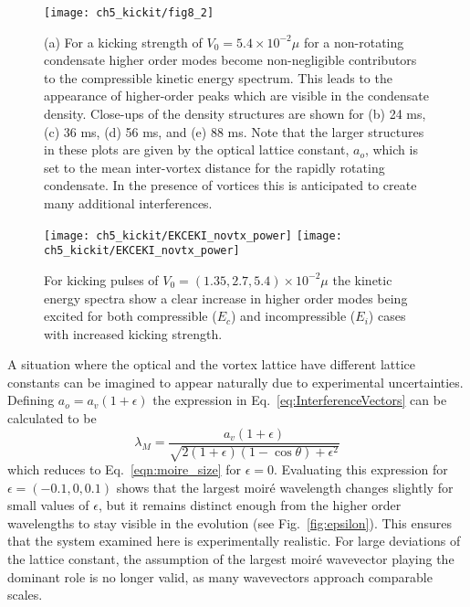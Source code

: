 \begin{figure}
    \centering
	\texttt{[image: ch5\_kickit/fig8\_2]}
	\caption[Higher order modes induced by stronger kicking.]{(a) For a kicking strength of $V_0 = 5.4\times10^{-2}\mu$ for a non-rotating condensate higher order modes become non-negligible contributors to the compressible kinetic energy spectrum. This leads to the appearance of higher-order peaks which are visible in the condensate density. Close-ups of the density structures are shown for (b) 24 ms, (c) 36 ms, (d) 56 ms, and (e) 88 ms. Note that the larger structures in these plots are given by the optical lattice constant, $a_o$, which is set to the mean inter-vortex distance for the rapidly rotating condensate. In the presence of vortices this is anticipated to create many additional interferences.}
	\label{fig:kickp20k}
\end{figure}
\begin{figure}
    \centering
    \texttt{[image: ch5\_kickit/EKCEKI\_novtx\_power]}
    \texttt{[image: ch5\_kickit/EKCEKI\_novtx\_power]}
	\caption[Comparison of kinetic energy spectra for increased kicking strengths.]{For kicking pulses of $V_0 = (1.35,2.7,5.4)\times 10^{-2} \mu$ the kinetic energy spectra show a clear increase in higher order modes being excited for both compressible ($E_c$) and incompressible ($E_i$) cases with increased kicking strength.}\label{fig:kick_compare_spec}
\end{figure}

    A situation where the optical and the vortex lattice have different lattice constants can be imagined to appear naturally due to experimental uncertainties. Defining $a_o = a_v(1+\epsilon)$ the expression in Eq.~\eqref{eq:InterferenceVectors} can be calculated to be
    \begin{equation}
    	\lambda_M = \frac{a_v(1+\epsilon)}{\sqrt{2(1+\epsilon)(1-\cos\theta) + \epsilon^2}}
    	\label{eqn:moire_size_eps}
    \end{equation}
    which reduces to Eq.~\eqref{eqn:moire_size} for $\epsilon=0$. Evaluating this expression for $\epsilon = (-0.1,0,0.1)$ shows that the largest moir\'e wavelength changes slightly for small values of $\epsilon$, but it remains distinct enough from the higher order wavelengths to stay visible in the evolution (see Fig.~\ref{fig:epsilon}). This ensures that the system examined here is experimentally realistic. For large deviations of the lattice constant, the assumption of the largest moir\'e wavevector playing the dominant role is no longer valid, as many wavevectors approach comparable scales.

